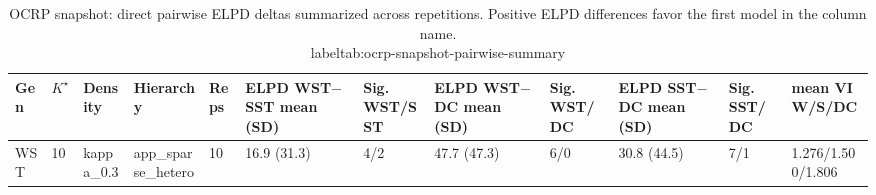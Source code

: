 \begin{table}[!h]
\centering
\caption{OCRP snapshot: direct pairwise ELPD deltas summarized across repetitions. Positive ELPD differences favor the first model in the column name.\\label{tab:ocrp-snapshot-pairwise-summary}}
\centering
\begin{tabular}[t]{llllllllllll}
\toprule
Gen & $K^\star$ & Density & Hierarchy & Reps & ELPD WST$-$SST mean (SD) & Sig. WST/SST & ELPD WST$-$DC mean (SD) & Sig. WST/DC & ELPD SST$-$DC mean (SD) & Sig. SST/DC & mean VI W/S/DC\\
\midrule
WST & 10 & kappa_0.3 & app_sparse_hetero & 10 & 16.9 (31.3) & 4/2 & 47.7 (47.3) & 6/0 & 30.8 (44.5) & 7/1 & 1.276/1.500/1.806\\
\bottomrule
\end{tabular}
\end{table}

